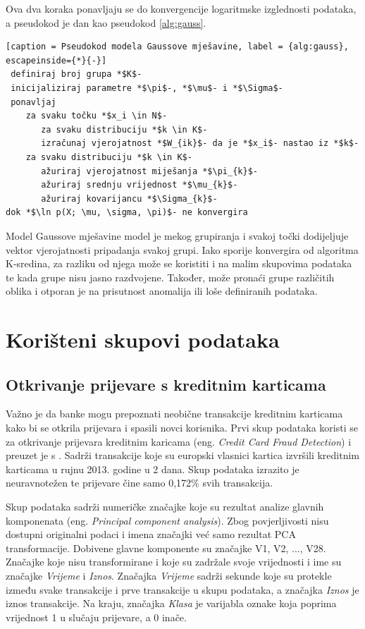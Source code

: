 \documentclass[utf8, diplomski, numeric]{fer}
\begin{document}
Ova dva koraka ponavljaju se do konvergencije logaritmske izglednosti podataka, a pseudokod je dan kao pseudokod \ref{alg:gauss}. 

\begin{lstlisting}[caption = Pseudokod modela Gaussove mješavine, label = {alg:gauss}, escapeinside={*}{-}]
 definiraj broj grupa *$K$-
 inicijaliziraj parametre *$\pi$-, *$\mu$- i *$\Sigma$-
 ponavljaj
    za svaku točku *$x_i \in N$-
       za svaku distribuciju *$k \in K$-
	   izračunaj vjerojatnost *$W_{ik}$- da je *$x_i$- nastao iz *$k$-
    za svaku distribuciju *$k \in K$-
       ažuriraj vjerojatnost miješanja *$\pi_{k}$-
       ažuriraj srednju vrijednost *$\mu_{k}$-
       ažuriraj kovarijancu *$\Sigma_{k}$-
dok *$\ln p(X; \mu, \sigma, \pi)$- ne konvergira 

\end{lstlisting}

Model Gaussove mješavine model je mekog grupiranja i svakoj točki dodijeljuje vektor vjerojatnosti pripadanja svakoj grupi. Iako sporije konvergira od algoritma K-sredina, za razliku od njega može se koristiti i na malim skupovima podataka te kada grupe nisu jasno razdvojene. Također, može pronaći grupe različitih oblika i otporan je na prisutnost anomalija ili loše definiranih podataka.

\chapter{Korišteni skupovi podataka}
\section{Otkrivanje prijevare s kreditnim karticama}
Važno je da banke mogu prepoznati neobične transakcije kreditnim karticama kako bi se otkrila prijevara i spasili novci korisnika. Prvi skup podataka koristi se za otkrivanje prijevara kreditnim karicama (eng. \textit{Credit Card Fraud Detection}) i preuzet je s \cite{pang2021deep}. Sadrži transakcije koje su europski vlasnici kartica izvršili kreditnim karticama u rujnu 2013. godine u 2 dana. Skup podataka izrazito je neuravnotežen te prijevare čine samo 0,172\% svih transakcija.

Skup podataka sadrži numeričke značajke koje su rezultat analize glavnih komponenata (eng. \textit{Principal component analysis}). Zbog povjerljivosti nisu dostupni originalni podaci i imena značajki već samo rezultat PCA transformacije. Dobivene glavne komponente su značajke V1, V2, ..., V28. Značajke koje nisu transformirane i koje su zadržale svoje vrijednosti i ime su značajke \textit{Vrijeme} i \textit{Iznos}. Značajka \textit{Vrijeme} sadrži sekunde koje su protekle između svake transakcije i prve transakcije u skupu podataka, a značajka \textit{Iznos} je iznos transakcije. Na kraju, značajka \textit{Klasa} je varijabla oznake koja poprima vrijednost 1 u slučaju prijevare, a 0 inače.
\end{document}
